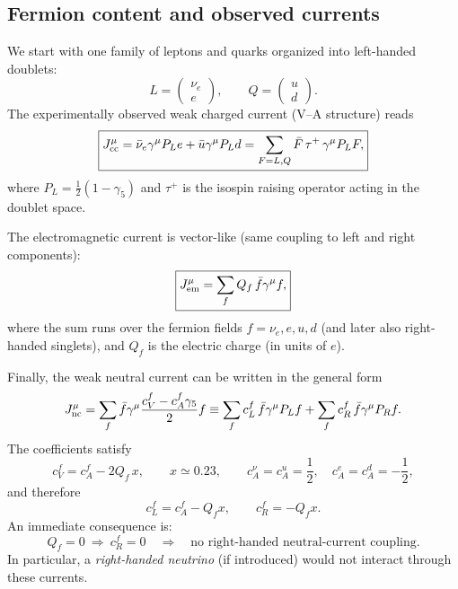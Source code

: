 \subsection{Fermion content and observed currents}
We start with one family of leptons and quarks organized into left-handed doublets:
\begin{equation}
L=\begin{pmatrix}\nu_e\\ e\end{pmatrix},
\qquad
Q=\begin{pmatrix}u\\ d\end{pmatrix}.
\end{equation}
The experimentally observed weak charged current (V--A structure) reads
\begin{equation}
\boxed{
J^\mu_{\rm cc}=\bar\nu_e\gamma^\mu P_L e+\bar u\gamma^\mu P_L d
=\sum_{F=L,Q}\bar F\,\tau^+\,\gamma^\mu P_L F,
}
\label{eq:Jcc}
\end{equation}
where $P_L=\frac{1}{2}(1-\gamma_5)$ and $\tau^+$ is the isospin raising operator acting in the doublet space.

The electromagnetic current is vector-like (same coupling to left and right components):
\begin{equation}
\boxed{
J^\mu_{\rm em}=\sum_f Q_f\,\bar f\gamma^\mu f,
}
\label{eq:Je}
\end{equation}
where the sum runs over the fermion fields $f=\nu_e,e,u,d$ (and later also right-handed singlets), and $Q_f$ is the electric charge (in units of $e$).

Finally, the weak neutral current can be written in the general form
\begin{equation}
J^\mu_{\rm nc}
=\sum_f \bar f\gamma^\mu\frac{c_V^f-c_A^f\gamma_5}{2}f
\equiv
\sum_f c_L^f\,\bar f\gamma^\mu P_L f+\sum_f c_R^f\,\bar f\gamma^\mu P_R f.
\end{equation}
The coefficients satisfy
\begin{equation}
c_V^f=c_A^f-2Q_f\,x,
\qquad x\simeq 0.23,
\qquad
c_A^\nu=c_A^u=\frac{1}{2},\quad c_A^e=c_A^d=-\frac{1}{2},
\end{equation}
and therefore
\begin{equation}
\boxed{
c_L^f=c_A^f-Q_f x,\qquad c_R^f=-Q_f x.
}
\label{eq:cLcR}
\end{equation}
An immediate consequence is:
\begin{equation}
Q_f=0\ \Longrightarrow\ c_R^f=0
\quad\Rightarrow\quad
\text{no right-handed neutral-current coupling.}
\end{equation}
In particular, a \emph{right-handed neutrino} (if introduced) would not interact through these currents.

